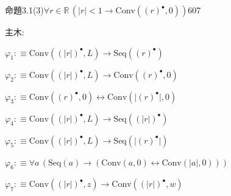 \begin{fullproof}{命題3.1(3)}{$\forall r \in \mathbb{R}\,(\lvert r \rvert < 1 \to \mathrm{Conv}({(r)^{\bullet}},0))$}{607}
\begin{ptree}
\noLine
{}
\noLine
{}
\end{ptree}
\noindent 主木:
\begin{ptree}
\noLine
{}
\end{ptree}
\begin{abbrevlist}
\item $\varphi_{1} :\equiv \mathrm{Conv}({(\lvert r \rvert)^{\bullet}},L) \to \mathrm{Seq}({(r)^{\bullet}})$
\item $\varphi_{2} :\equiv \mathrm{Conv}({(\lvert r \rvert)^{\bullet}},L) \to \mathrm{Conv}({(r)^{\bullet}},0)$
\item $\varphi_{3} :\equiv \mathrm{Conv}({(r)^{\bullet}},0) \leftrightarrow \mathrm{Conv}(\lvert {(r)^{\bullet}} \rvert,0)$
\item $\varphi_{4} :\equiv \mathrm{Conv}({(\lvert r \rvert)^{\bullet}},L) \to \mathrm{Seq}({(\lvert r \rvert)^{\bullet}})$
\item $\varphi_{5} :\equiv \mathrm{Conv}({(\lvert r \rvert)^{\bullet}},L) \to \mathrm{Seq}(\lvert {(r)^{\bullet}} \rvert)$
\item $\varphi_{6} :\equiv \forall a\,(\mathrm{Seq}(a) \to (\mathrm{Conv}(a,0) \leftrightarrow \mathrm{Conv}(\lvert a \rvert,0)))$
\item $\varphi_{7} :\equiv \mathrm{Conv}({(\lvert r \rvert)^{\bullet}},z) \to \mathrm{Conv}({(\lvert r \rvert)^{\bullet}},w)$

\end{abbrevlist}
\end{fullproof}
